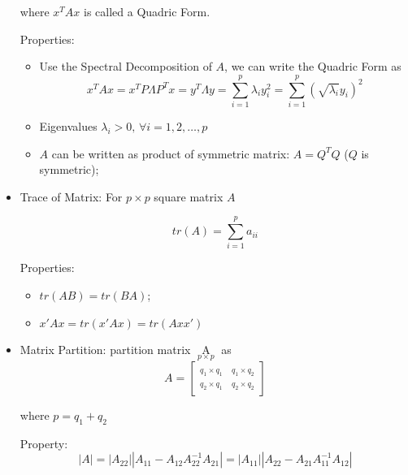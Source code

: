 \begin{itemize}[topsep=6pt,itemsep=4pt]
        where $ x^TAx $ is called a Quadric Form.

        Properties:
        \begin{itemize}[topsep=6pt,itemsep=4pt]
            \item Use the Spectral Decomposition of $ A $, we can write the Quadric Form as
            \begin{equation}
                x^TAx=x^TP\Lambda P^Tx=y^T\Lambda y=\sum_{i=1}^p\lambda_iy_i^2=\sum_{i=1}^p(\sqrt{\lambda_i}y_i)^2 
            \end{equation}
            
            
            \item Eigenvalues $ \lambda _i>0,\,\forall i=1,2,\ldots,p $
            \item $ A $ can be written as product of symmetric matrix: $ A= Q^TQ$ ($ Q $ is symmetric);
        \end{itemize}

        \item Trace of Matrix: For $ p\times p $ square matrix $ A $
            
            \begin{equation}
                tr(A) =\sum_{i=1}^p a_{ii}
            \end{equation}
            
            Properties:
            \begin{itemize}[topsep=2pt,itemsep=2pt]
                \item $ tr(AB)=tr(BA)  $;
                \item $ x'Ax=tr(x'Ax)=tr(Axx') $
            \end{itemize}
            
                
        \item Matrix Partition: partition matrix $ \mathop{A}\limits_{p\times p} $ as 
        \[
            A=         
            \begin{bmatrix}
                \mathop{A_{11} }\limits_{q_1\times q_1}&\mathop{A_{12} }\limits_{q_1\times q_2} \\
                \mathop{A_{21} }\limits_{q_2\times q_1}&\mathop{A_{22} }\limits_{q_2\times q_2}   
            \end{bmatrix}   
        \]

        where $ p=q_1+q_2 $
        
        Property:
        \[
            |A|= |A_{22}||A_{11}-A_{12}A_{22}^{-1}A_{21}|=|A_{11}||A_{22}-A_{21}A_{11}^{-1}A_{12}|
        \]
        

\end{itemize}
